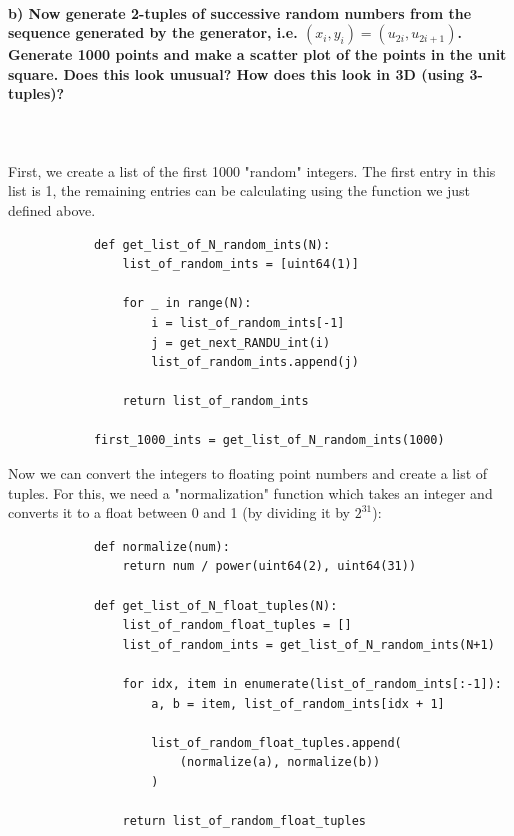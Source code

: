 \documentclass[11 pt]{article}
\begin{document}
        \paragraph{b) Now generate 2-tuples of successive random numbers from 
            the sequence generated by the generator, i.e. 
            $(x_i,y_i)=(u_{2i},u_{2i+1})$. Generate 1000 points and make a 
            scatter plot of the points in the unit square. Does this look 
            unusual? How does this look in 3D (using 3-tuples)?
        } \ \\
        \\
        First, we create a list of the first 1000 "random" integers. The 
        first entry in this list is 1, the remaining entries can be calculating
        using the function we just defined above.
        \begin{lstlisting}
            def get_list_of_N_random_ints(N):
                list_of_random_ints = [uint64(1)]
            
                for _ in range(N):
                    i = list_of_random_ints[-1]
                    j = get_next_RANDU_int(i)
                    list_of_random_ints.append(j)
            
                return list_of_random_ints

            first_1000_ints = get_list_of_N_random_ints(1000)\end{lstlisting}
        \newpage \noindent
        Now we can convert the integers to floating point numbers and 
        create a list of tuples. For this, we need a "normalization" function 
        which takes an integer and converts it to a float between 0 and 1 
        (by dividing it by $2^{31}$): \ \\
        \begin{lstlisting}
            def normalize(num):
                return num / power(uint64(2), uint64(31))
            
            def get_list_of_N_float_tuples(N):
                list_of_random_float_tuples = []
                list_of_random_ints = get_list_of_N_random_ints(N+1)
            
                for idx, item in enumerate(list_of_random_ints[:-1]):
                    a, b = item, list_of_random_ints[idx + 1]
            
                    list_of_random_float_tuples.append(
                        (normalize(a), normalize(b))
                    )
            
                return list_of_random_float_tuples\end{lstlisting} \ \\
\end{document}
